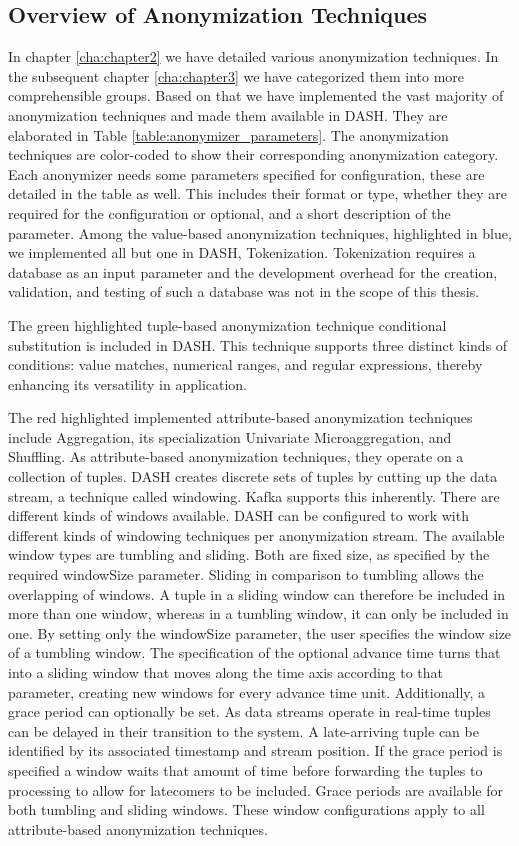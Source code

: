 \subsection{Overview of Anonymization Techniques}
In chapter \ref{cha:chapter2} we have detailed various anonymization techniques. In the subsequent chapter \ref{cha:chapter3} we have categorized them into more comprehensible groups. Based on that we have implemented the vast majority of anonymization techniques and made them available in \ac{DASH}. They are elaborated in Table \ref{table:anonymizer_parameters}. The anonymization techniques are color-coded to show their corresponding anonymization category. Each anonymizer needs some parameters specified for configuration, these are detailed in the table as well. This includes their format or type, whether they are required for the configuration or optional, and a short description of the parameter. Among the value-based anonymization techniques, highlighted in blue, we implemented all but one in \ac{DASH}, Tokenization. Tokenization requires a database as an input parameter and the development overhead for the creation, validation, and testing of such a database was not in the scope of this thesis.\par 
The green highlighted tuple-based anonymization technique conditional substitution is included in \ac{DASH}. This technique supports three distinct kinds of conditions: value matches, numerical ranges, and regular expressions, thereby enhancing its versatility in application.\par 
The red highlighted implemented attribute-based anonymization techniques include Aggregation, its specialization Univariate Microaggregation, and Shuffling. As attribute-based anonymization techniques, they operate on a collection of tuples. \ac{DASH} creates discrete sets of tuples by cutting up the data stream, a technique called windowing. Kafka supports this inherently. There are different kinds of windows available. \ac{DASH} can be configured to work with different kinds of windowing techniques per anonymization stream. The available window types are tumbling and sliding. Both are fixed size, as specified by the required windowSize parameter. Sliding in comparison to tumbling allows the overlapping of windows. A tuple in a sliding window can therefore be included in more than one window, whereas in a tumbling window, it can only be included in one. By setting only the windowSize parameter, the user specifies the window size of a tumbling window. The specification of the optional advance time turns that into a sliding window that moves along the time axis according to that parameter, creating new windows for every advance time unit. Additionally, a grace period can optionally be set. As data streams operate in real-time tuples can be delayed in their transition to the system. A late-arriving tuple can be identified by its associated timestamp and stream position. If the grace period is specified a window waits that amount of time before forwarding the tuples to processing to allow for latecomers to be included. Grace periods are available for both tumbling and sliding windows. These window configurations apply to all attribute-based anonymization techniques. \par 
